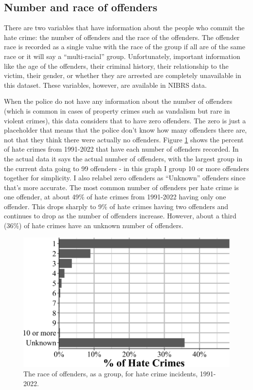 \documentclass[
  12pt,
  openany]{book}
\begin{document}
\subsection{Number and race of offenders}\label{number-and-race-of-offenders}

There are two variables that have information about the people who commit the hate crime: the number of offenders and the race of the offenders. The offender race is recorded as a single value with the race of the group if all are of the same race or it will say a ``multi-racial'' group. Unfortunately, important information like the age of the offenders, their criminal history, their relationship to the victim, their gender, or whether they are arrested are completely unavailable in this dataset. These variables, however, are available in NIBRS data.

When the police do not have any information about the number of offenders (which is common in cases of property crimes such as vandalism but rare in violent crimes), this data considers that to have zero offenders. The zero is just a placeholder that means that the police don't know how many offenders there are, not that they think there were actually no offenders. Figure \ref{fig:hateCrimeOffenderNumber} shows the percent of hate crimes from 1991-2022 that have each number of offenders recorded. In the actual data it says the actual number of offenders, with the largest group in the current data going to 99 offenders - in this graph I group 10 or more offenders together for simplicity. I also relabel zero offenders as ``Unknown'' offenders since that's more accurate. The most common number of offenders per hate crime is one offender, at about 49\% of hate crimes from 1991-2022 having only one offender. This drops sharply to 9\% of hate crimes having two offenders and continues to drop as the number of offenders increase. However, about a third (36\%) of hate crimes have an unknown number of offenders.

\begin{figure}

{\centering \includegraphics[width=0.9\linewidth]{09_hate_crime_files/figure-latex/hateCrimeOffenderNumber-1} 

}

\caption{The race of offenders, as a group, for hate crime incidents, 1991-2022.}\label{fig:hateCrimeOffenderNumber}
\end{figure}
\end{document}
